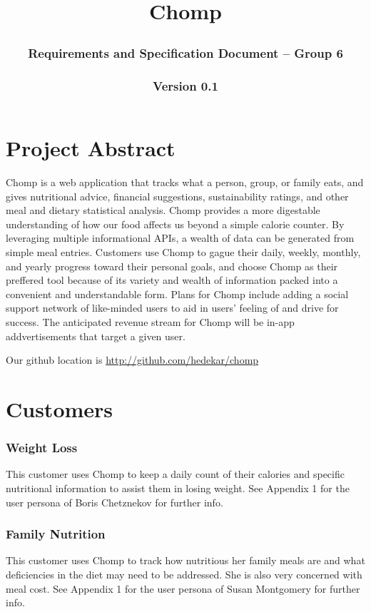 \documentclass[a4paper,12pt]{article}
\begin{document}
\title{Chomp
\subsubsection*{Requirements and Specification Document -- Group 6}\subsubsection*{Version 0.1}
}\maketitle
\section*{Project Abstract}
Chomp is a web application that tracks what a person, group, or family eats, and gives nutritional advice, financial suggestions, sustainability ratings, and other meal and dietary statistical analysis.  Chomp provides a more digestable understanding of how our food affects us beyond a simple calorie counter.  By leveraging multiple informational APIs, a wealth of data can be generated from simple meal entries.  Customers use Chomp to gague their daily, weekly, monthly, and yearly progress toward their personal goals, and choose Chomp as their preffered tool because of its variety and wealth of information packed into a convenient and understandable form.  Plans for Chomp include adding a social support network of like-minded users to aid in users' feeling of and drive for success.  The anticipated revenue stream for Chomp will be in-app addvertisements that target a given user.

Our github location is \url{http://github.com/hedekar/chomp}
\section*{Customers}
\subsubsection*{Weight Loss}
This customer uses Chomp to keep a daily count of their calories and specific nutritional information to assist them in losing weight.  See Appendix 1 for the user persona of Boris Chetznekov for further info.
\subsubsection*{Family Nutrition}
This customer uses Chomp to track how nutritious her family meals are and what deficiencies in the diet may need to be addressed.  She is also very concerned with meal cost.  See Appendix 1 for the user persona of Susan Montgomery for further info.
\end{document}
